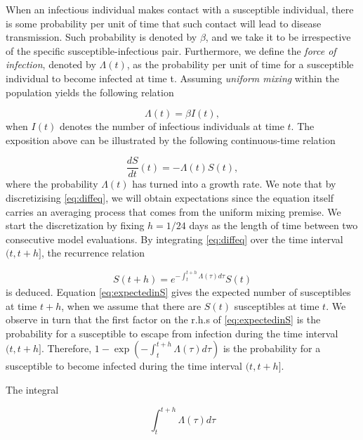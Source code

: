 \documentclass[a4paper,preprint]{elsarticle}
\begin{document}
When an infectious individual makes contact with a susceptible individual, there is some probability per unit of time that such contact will lead to disease transmission. Such probability is denoted by $\beta$, and we take it to be irrespective of the specific susceptible-infectious pair. Furthermore, we define the \textit{force of infection}, denoted by $\Lambda(t)$, as the probability per unit of time for a susceptible individual to become infected at time t. Assuming \textit{uniform mixing} within the population yields the following relation 

\begin{equation}
\label{eq:lawofmassaction}
\Lambda(t)=\beta I(t),
\end{equation}
when $I(t)$ denotes the number of infectious individuals at time $t$. The exposition above can be illustrated by the following continuous-time relation   

\begin{equation}
\label{eq:diffeq}
    \dfrac{dS}{dt}(t)=-\Lambda(t)S(t),
\end{equation}
%
where the probability $\Lambda(t)$ has turned into a growth rate. We note that by discretizising \eqref{eq:diffeq}, we will obtain expectations since the equation itself carries an averaging process that comes from the uniform mixing premise. We start the discretization by fixing $h=1/24$ days as the length of time between two consecutive model evaluations. By integrating \eqref{eq:diffeq} over the time interval $(t,t+h]$, the recurrence relation 

\begin{equation} 
\label{eq:expectedinS}
        S(t+h)=e^{-\int_{t}^{t+h} \Lambda(\tau)d\tau}S(t) 
\end{equation}
%
is deduced. Equation \eqref{eq:expectedinS} gives the expected number of
susceptibles  at time $t+h$, when we assume that there are $S(t)$ susceptibles
at time $t$. We observe in turn that the first factor on the r.h.s of
\eqref{eq:expectedinS} is the probability for a susceptible to escape from
infection during the time interval $(t,t+h]$. Therefore,
$1-\exp(-\int_{t}^{t+h} \Lambda(\tau)d\tau)$ is the probability for a
susceptible to become infected during the time interval $(t,t+h]$. 

The integral 

\begin{equation}
\label{eq:cumulativeforce}
  \int_{t}^{t+h} \Lambda(\tau)d\tau  
\end{equation}
\end{document}
